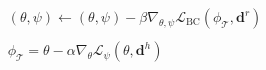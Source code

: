 \begin{equation}
 \label{eq:daml_temporal_adaptation_loss}
 \begin{matrix}
    (\theta, \psi) \leftarrow(\theta, \psi)-\beta \nabla_{\theta, \psi} \mathcal{L}_{\mathrm{BC}}\left(\phi_{\mathcal{T}}, \mathbf{d}^r\right) \\ \\
   \phi_{\mathcal{T}}=\theta-\alpha \nabla_\theta \mathcal{L}_\psi\left(\theta, \mathbf{d}^h\right)
   \end{matrix}
\end{equation}
